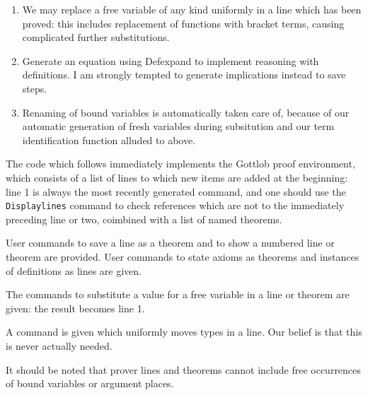 \documentclass{article}
\begin{document}
{{\begin{enumerate}
\begin{enumerate}
\item  From $A \rightarrow C_1 \rightarrow \ldots \rightarrow C_m \rightarrow B$ and $\sim A \rightarrow D_1 \rightarrow \ldots \rightarrow D_n \rightarrow B$ we can deduce $C_1 \rightarrow \ldots \rightarrow C_m \rightarrow D_1 \rightarrow \ldots \rightarrow D_n \rightarrow B$.   We call this ``reasoning by cases", though again it might be thought to be more general than that.

\end{enumerate}



\item We may replace a free variable of any kind uniformly in a line which has
been proved:  this includes replacement of functions with bracket terms, causing complicated further substitutions.

\item Generate an equation  using Defexpand to implement reasoning with definitions.  I am strongly tempted to generate implications instead to save 
steps.

\item Renaming of bound variables is automatically taken care of, because of our automatic generation of fresh variables during subsitution and our term identification function alluded to above.

\end{enumerate}

The code which follows immediately implements the Gottlob proof environment, which consists of a list of lines to which new items are added at the beginning:  line 1 is always the most recently generated command, and one should use the {\tt Displaylines} command to check references which are not to the immediately preceding line or two, coimbined with a list of named theorems.

User commands to save a line as a theorem and to show a numbered line or theorem are provided.  User commands to state axioms as theorems and instances of definitions as lines are given.

The commands to substitute  a value for a free variable in a line or theorem are given:  the result becomes line 1.

A command is given which uniformly moves types in a line.  Our belief is that this is never actually needed.

It should be noted that prover lines and theorems cannot include free occurrences of bound variables or argument places.

}}
\end{document}
